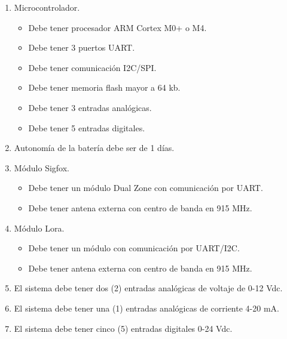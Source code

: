 \begin{enumerate}

	\item Microcontrolador.

	\begin{itemize}

		\item Debe tener procesador ARM Cortex M0+ o M4.

		\item Debe tener 3 puertos UART.

		\item Debe tener comunicación I2C/SPI.

		\item Debe tener memoria flash mayor a 64 kb.

		\item Debe tener 3 entradas analógicas.

		\item Debe tener 5 entradas digitales.

	\end{itemize}


	\item Autonomía de la batería debe ser de 1 días.

	\item Módulo Sigfox.

		\begin{itemize}

			\item Debe tener un módulo Dual Zone con comunicación por UART.

			\item Debe tener antena externa con centro de banda en 915 MHz.

		\end{itemize}

	\item Módulo Lora.

		\begin{itemize}

			\item Debe tener un módulo con comunicación por UART/I2C.

			\item Debe tener antena externa con centro de banda en 915 MHz.

		\end{itemize}

		\item El sistema debe tener dos (2) entradas analógicas de voltaje de 0-12 Vdc.

		\item El sistema debe tener una (1) entradas analógicas de corriente 4-20 mA.

		\item El sistema debe tener cinco (5) entradas digitales 0-24 Vdc.

\end{enumerate}



